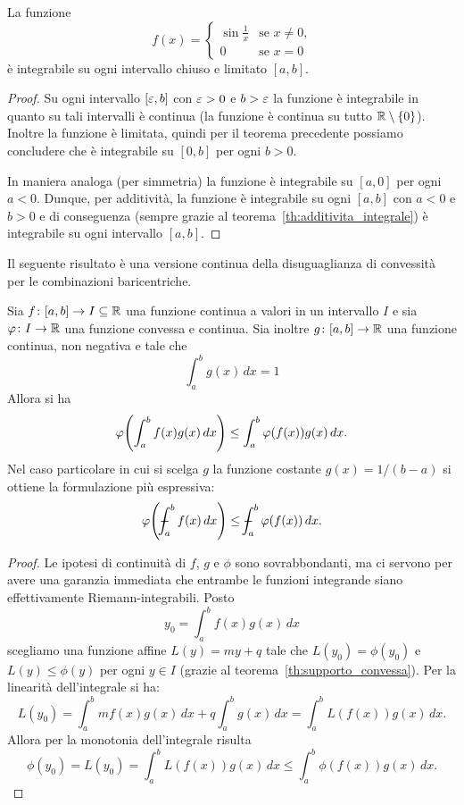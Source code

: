     \begin{example}
    La funzione
    \[
      f(x) = \begin{cases}
      \sin\frac 1 x & \text{se $x\neq 0$,}\\
      0 & \text{se $x=0$}
      \end{cases}
    \]
    è integrabile su ogni intervallo chiuso e limitato $[a,b]$.
    \end{example}
    \begin{proof}
    Su ogni intervallo $[\varepsilon,b]$ con $\varepsilon>0$ e $b>\varepsilon$ la funzione
    è integrabile in quanto su tali intervalli è continua (la funzione è continua su
    tutto ${\mathbb R}\setminus{\left\{ 0 \right\}}$). Inoltre la funzione è limitata, quindi per il teorema
    precedente possiamo concludere che è integrabile su $[0,b]$ per ogni $b>0$.
    
    In maniera analoga (per simmetria) la funzione è integrabile su $[a,0]$
    per ogni $a<0$.
    Dunque, per additività, la funzione è integrabile su ogni $[a,b]$ con $a<0$ e $b>0$
    e di conseguenza (sempre grazie al teorema~\ref{th:additivita_integrale})
    è integrabile su ogni intervallo $[a,b]$.
    \end{proof}
    
    Il seguente risultato è una versione continua della disuguaglianza di convessità 
    per le combinazioni baricentriche.
    \begin{theorem}
      \label{th:jensen}%
    Sia $f\colon[a,b]\to I\subseteq {\mathbb R}$ una funzione continua a valori 
    in un intervallo $I$ e sia $\varphi\colon I \to {\mathbb R}$ una funzione convessa e continua.
    Sia inoltre $g\colon [a,b]\to {\mathbb R}$ una funzione continua,
    non negativa e tale che 
    \[
        \int_a^b g(x)\, dx = 1
    \]
    Allora si ha 
      \[
      \varphi{\left( \int_a^b f(x) g(x) \, dx \right)} \le \int_a^b \varphi(f(x)) g(x)\, dx.
      \]
    Nel caso particolare in cui si scelga $g$ la funzione costante $g(x)=1/(b-a)$ si ottiene 
    la formulazione più espressiva:
    \[
      \phi\enclose{\dashint_a^b f(x)\, dx} \le \dashint_a^b \phi(f(x))\, dx.
    \]
    \end{theorem}
    \begin{proof}
    Le ipotesi di continuità di $f$, $g$ e $\phi$ sono sovrabbondanti, ma ci servono 
    per avere una garanzia immediata che entrambe le funzioni integrande
    siano effettivamente Riemann-integrabili.
    Posto 
    \[
      y_0 = \int_a^b f(x) g(x)\, dx 
    \]
    scegliamo una funzione affine $L(y) = my + q$ tale che $L(y_0)=\phi(y_0)$ 
    e $L(y)\le \phi(y)$ per ogni $y\in I$ (grazie al teorema~\ref{th:supporto_convessa}).
    Per la linearità dell'integrale si ha: 
    \[
      L(y_0)
      = \int_a^b mf(x)g(x)\, dx + q \int_a^b g(x)\, dx
      = \int_a^b L(f(x)) g(x)\, dx.
    \]
    Allora per la monotonia dell'integrale risulta
    \[
      \phi(y_0) = L(y_0) = \int_a^b L(f(x)) g(x)\, dx \le \int_a^b \phi(f(x)) g(x)\, dx.
    \]
    \end{proof}
    
